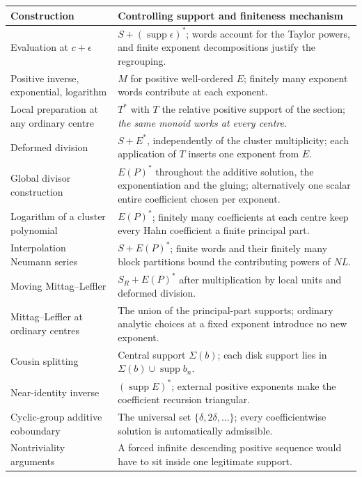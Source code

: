 \documentclass[11pt,letterpaper]{article}
\theoremstyle{definition}
\theoremstyle{remark}
\newcommand{\supp}{\operatorname{supp}}
\numberwithin{equation}{section}
\begin{document}
\begin{center}\small
\begin{longtable}{@{}L{0.36\textwidth}L{0.55\textwidth}@{}}
\toprule
Construction & Controlling support and finiteness mechanism\\
\midrule
\endhead
Evaluation at $c+\epsilon$ & $S+(\supp\epsilon)^*$; words account for the Taylor powers, and finite exponent decompositions justify the regrouping.\\[0.4em]
Positive inverse, exponential, logarithm & $M$ for positive well-ordered $E$; finitely many exponent words contribute at each exponent.\\[0.4em]
Local preparation at any ordinary centre & $T^*$ with $T$ the relative positive support of the section; \emph{the same monoid works at every centre}.\\[0.4em]
Deformed division & $S+E^*$, independently of the cluster multiplicity; each application of $T$ inserts one exponent from $E$.\\[0.4em]
Global divisor construction & $E(P)^*$ throughout the additive solution, the exponentiation and the gluing; alternatively one scalar entire coefficient chosen per exponent.\\[0.4em]
Logarithm of a cluster polynomial & $E(P)^*$; finitely many coefficients at each centre keep every Hahn coefficient a finite principal part.\\[0.4em]
Interpolation Neumann series & $S+E(P)^*$; finite words and their finitely many block partitions bound the contributing powers of $NL$.\\[0.4em]
Moving Mittag--Leffler & $S_R+E(P)^*$ after multiplication by local units and deformed division.\\[0.4em]
Mittag--Leffler at ordinary centres & The union of the principal-part supports; ordinary analytic choices at a fixed exponent introduce no new exponent.\\[0.4em]
Cousin splitting & Central support $\Sigma(b)$; each disk support lies in $\Sigma(b)\cup\supp b_n$.\\[0.4em]
Near-identity inverse & $(\supp E)^*$; external positive exponents make the coefficient recursion triangular.\\[0.4em]
Cyclic-group additive coboundary & The universal set $\{\delta,2\delta,\dots\}$; every coefficientwise solution is automatically admissible.\\[0.4em]
Nontriviality arguments & A forced infinite descending positive sequence would have to sit inside one legitimate support.\\[0.4em]

\end{longtable}
\end{center}
\end{document}
